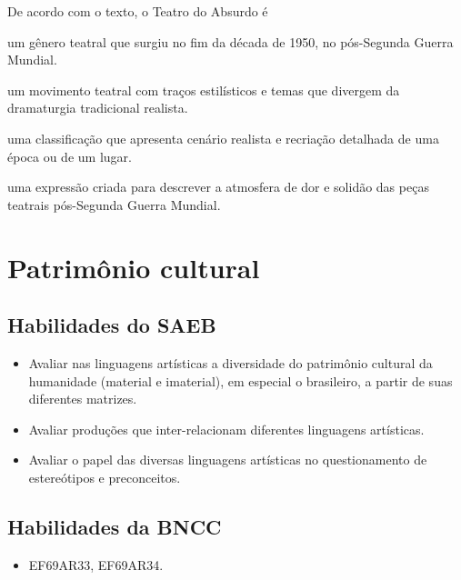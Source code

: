 \pagebreak
De acordo com o texto, o Teatro do Absurdo é

\begin{escolha}
\item
  um gênero teatral que surgiu no fim da década de 1950, no pós-Segunda
  Guerra Mundial.
\item
  um movimento teatral com traços estilísticos e temas que divergem da
  dramaturgia tradicional realista.
\item
  uma classificação que apresenta cenário realista e recriação detalhada
  de uma época ou de um lugar.
\item
  uma expressão criada para descrever a atmosfera de dor e solidão das
  peças teatrais pós-Segunda Guerra Mundial.
\end{escolha}


\chapter{Patrimônio cultural}

\section{Habilidades do SAEB}

\begin{itemize}
\item Avaliar nas linguagens artísticas a diversidade do patrimônio cultural
da humanidade (material e imaterial), em especial o brasileiro, a partir
de suas diferentes matrizes.
\item Avaliar produções que inter-relacionam diferentes linguagens
artísticas.
\item Avaliar o papel das diversas linguagens artísticas no questionamento
de estereótipos e preconceitos.
\end{itemize}

\section*{Habilidades da BNCC}

\begin{itemize}
\item EF69AR33, EF69AR34.
\end{itemize}

